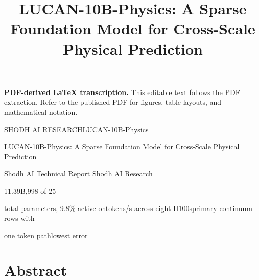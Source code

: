 \documentclass[11pt]{article}
\title{LUCAN-10B-Physics: A Sparse Foundation Model for Cross-Scale Physical Prediction}
\author{}
\date{}
\begin{document}
\maketitle
\noindent\textbf{PDF-derived LaTeX transcription.} This editable text follows the PDF extraction. Refer to the published PDF for figures, table layouts, and mathematical notation.



\noindent SHODH AI RESEARCH\quad LUCAN-10B-Physics\par





LUCAN-10B-Physics: A Sparse Foundation
Model for Cross-Scale Physical Prediction


Shodh AI Technical Report
Shodh AI Research


\noindent 11.39B,998 of 25\par


\noindent total parameters, 9.8\% active on\quad tokens/s across eight H100s\quad primary continuum rows with\par


\noindent one token path\quad lowest error\par




\section*{Abstract}
\end{document}
